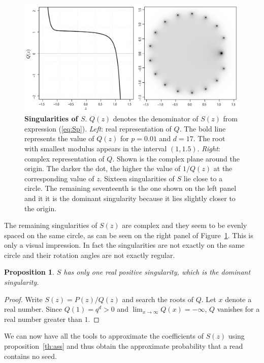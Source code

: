 \documentclass{article}
\newtheorem{proposition}{Proposition}
\begin{document}
\begin{figure}[h]
\centering
\includegraphics[scale=0.365]{singularityS.pdf}
\caption{\textbf{Singularities of $S$}. $Q(z)$ denotes the
denominator of $S(z)$ from expression (\ref{eq:Sp}). \textit{Left}: real
representation of $Q$. The bold line represents the value of $Q(z)$ for
$p=0.01$ and $d=17$. The root with smallest modulus appears in the
interval $(1, 1.5)$. \textit{Right}: complex representation of $Q$. Shown
is the complex plane around the origin. The darker the dot, the higher the
value of $1/Q(z)$ at the corresponding value of $z$. Sixteen singularities
of $S$ lie close to a circle. The remaining seventeenth is the one shown
on the left panel and it it is the dominant singularity because it lies
slightly closer to the origin.}
\label{fig:plotQ}
\end{figure}

The remaining singularities of $S(z)$ are complex and they seem to be
evenly spaced on the same circle, as can be seen on the right panel of
Figure~\ref{fig:plotQ}. This is only a visual impression. In fact the
singularities are not exactly on the same circle and their rotation angles
are not exactly regular.

\begin{proposition}
\label{th:roots}
$S$ has only one real positive singularity, which is the dominant
singularity.
\end{proposition}

\begin{proof}
Write $S(z) = P(z)/Q(z)$ and search the roots of $Q$. Let $x$ denote a
real number. Since $Q(1) = q^d > 0$ and $\lim_{x\rightarrow \infty} Q(x) =
-\infty$, $Q$ vanishes for a real number greater than $1$.
\end{proof}

We can now have all the tools to approximate the coefficients of $S(z)$
using proposition~\ref{th:ass} and thus obtain the approximate probability
that a read contains no seed.
\end{document}
